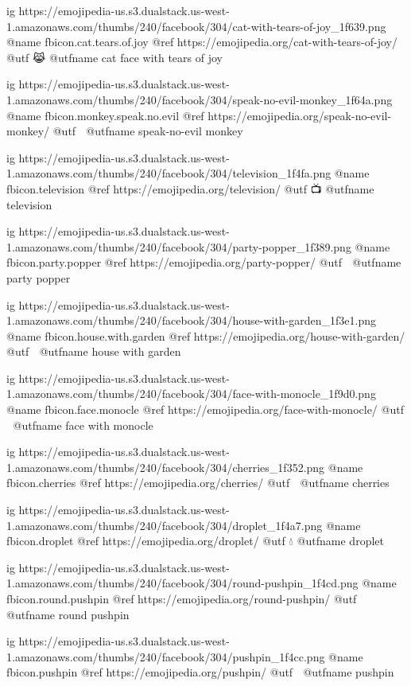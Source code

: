   ig https://emojipedia-us.s3.dualstack.us-west-1.amazonaws.com/thumbs/240/facebook/304/cat-with-tears-of-joy_1f639.png
  @name fbicon.cat.tears.of.joy
  @ref https://emojipedia.org/cat-with-tears-of-joy/
  @utf 😹
  @utfname cat face with tears of joy

  ig https://emojipedia-us.s3.dualstack.us-west-1.amazonaws.com/thumbs/240/facebook/304/speak-no-evil-monkey_1f64a.png
  @name fbicon.monkey.speak.no.evil
  @ref https://emojipedia.org/speak-no-evil-monkey/
  @utf 🙊
  @utfname speak-no-evil monkey


  ig https://emojipedia-us.s3.dualstack.us-west-1.amazonaws.com/thumbs/240/facebook/304/television_1f4fa.png
  @name fbicon.television
  @ref https://emojipedia.org/television/
  @utf 📺
  @utfname television

  ig https://emojipedia-us.s3.dualstack.us-west-1.amazonaws.com/thumbs/240/facebook/304/party-popper_1f389.png
  @name fbicon.party.popper
  @ref https://emojipedia.org/party-popper/
  @utf 🎉
  @utfname party popper

  ig https://emojipedia-us.s3.dualstack.us-west-1.amazonaws.com/thumbs/240/facebook/304/house-with-garden_1f3e1.png
  @name fbicon.house.with.garden
  @ref https://emojipedia.org/house-with-garden/
  @utf 🏡
  @utfname house with garden

  ig https://emojipedia-us.s3.dualstack.us-west-1.amazonaws.com/thumbs/240/facebook/304/face-with-monocle_1f9d0.png
  @name fbicon.face.monocle
  @ref https://emojipedia.org/face-with-monocle/
  @utf 🧐
  @utfname face with monocle

  ig https://emojipedia-us.s3.dualstack.us-west-1.amazonaws.com/thumbs/240/facebook/304/cherries_1f352.png
  @name fbicon.cherries
  @ref https://emojipedia.org/cherries/
  @utf 🍒
  @utfname cherries

  ig https://emojipedia-us.s3.dualstack.us-west-1.amazonaws.com/thumbs/240/facebook/304/droplet_1f4a7.png
  @name fbicon.droplet
  @ref https://emojipedia.org/droplet/
  @utf 💧
  @utfname droplet

  ig https://emojipedia-us.s3.dualstack.us-west-1.amazonaws.com/thumbs/240/facebook/304/round-pushpin_1f4cd.png
  @name fbicon.round.pushpin
  @ref https://emojipedia.org/round-pushpin/
  @utf 📍
  @utfname round pushpin

  ig https://emojipedia-us.s3.dualstack.us-west-1.amazonaws.com/thumbs/240/facebook/304/pushpin_1f4cc.png
  @name fbicon.pushpin
  @ref https://emojipedia.org/pushpin/
  @utf 📌
  @utfname pushpin

